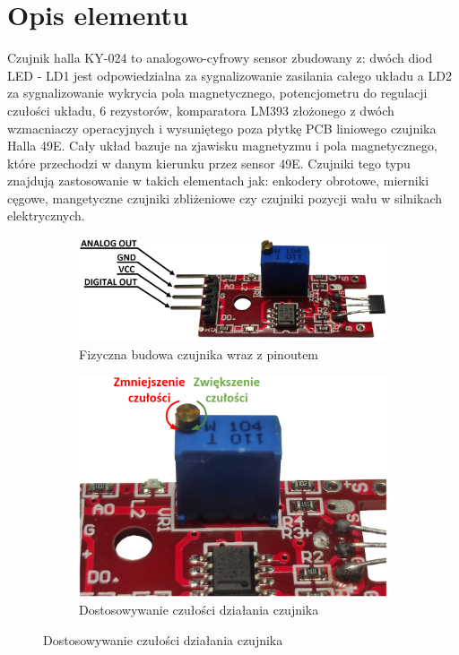\documentclass[11pt, a4paper]{article}
\author{Jakub Grzesiak}
\begin{document}
%
%
\newpage

\section*{Opis elementu}
Czujnik halla KY-024 to analogowo-cyfrowy sensor zbudowany z: dwóch diod LED - LD1 jest odpowiedzialna za sygnalizowanie zasilania całego układu a LD2 za sygnalizowanie wykrycia pola magnetycznego, potencjometru do regulacji czułości układu, 6 rezystorów, komparatora LM393 złożonego z dwóch wzmacniaczy operacyjnych i wysuniętego poza płytkę PCB liniowego czujnika Halla 49E. Cały układ bazuje na zjawisku magnetyzmu i pola magnetycznego, które przechodzi w danym kierunku przez sensor 49E. Czujniki tego typu znajdują zastosowanie w takich elementach jak: enkodery obrotowe, mierniki cęgowe, mangetyczne czujniki zbliżeniowe czy czujniki pozycji wału w silnikach elektrycznych.


\vspace{0.25cm}
\begin{figure}[h]
\centering
\begin{subfigure}{.47\textwidth}
\centering
\includegraphics[width=1.1\linewidth]{fig/KY-024/zdj_modulu/pinout.png}
\caption{Fizyczna budowa czujnika wraz z pinoutem}
\label{fig:_zdjecie_elementu}
\end{subfigure}%
\begin{subfigure}{.6\textwidth}
\centering
\includegraphics[width=.6\linewidth]{fig/KY-024/zdj_modulu/sensitivity.png}
\caption{Dostosowywanie czułości działania czujnika}
\label{fig:_zasada_dzialania_czulosc}
\end{subfigure}
\label{fig:element}
\end{figure}
\vspace{0.25cm}
\end{document}
